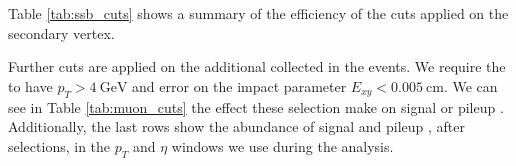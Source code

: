 Table \ref{tab:ssb_cuts} shows a summary of the efficiency of the cuts applied on the secondary vertex.



Further cuts are applied on the additional \Pgm collected in the events.
We require the \Pgm to have $p_T>\SI{4}{\GeV}$ and error on the impact parameter $E_{xy} < \SI{0.005}{\cm}$.
We can see in Table \ref{tab:muon_cuts} the effect these selection make on signal or pileup \Pgm.
Additionally, the last rows show the abundance of signal and pileup \Pgm, after selections, in the $p_T$ and $\eta$ windows we use during the analysis.


